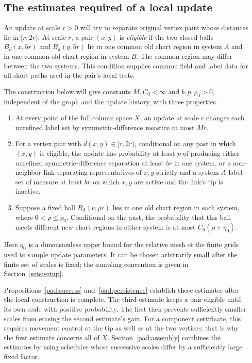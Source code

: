 \subsection{The estimates required of a local update}

An update at scale $r>0$ will try to separate original vertex pairs
whose distances lie in $[r,2r)$. At scale $r$, a pair $(x,y)$ is
\emph{eligible} if the two closed balls $B_d(x,5r)$ and $B_d(y,5r)$
lie in one common old chart region in system $A$ and in one common
old chart region in system $B$. The common region may differ between
the two systems. This condition supplies common field and label data
for all short paths used in the pair's local tests.

The construction below will give constants $M,C_0<\infty$ and
$b,p,\rho_0>0$, independent of the graph and the update history,
with three properties.
\begin{enumerate}
\item At every point of the full column space $X$, an update at scale
$r$ changes each unrefined label set by symmetric-difference measure
at most $Mr$.
\item For a vertex pair with $d(x,y)\in[r,2r)$, conditional on any past
in which $(x,y)$ is eligible, the update
has probability at least $p$ of producing either unrefined symmetric-difference separation
at least $br$ in one system, or a non-neighbor link separating
representatives of $x,y$ strictly and a system-$A$ label set of measure
at least $br$ on which $x,y$ are active and the link's tip is inactive.
\item Suppose a fixed ball $B_d(v,\rho r)$ lies in one old chart region in each
system, where $0<\rho\le\rho_0$. Conditional on the past, the probability
that this ball meets different new chart regions in either system is
at most $C_0(\rho+\eta_0)$.
\end{enumerate}
Here $\eta_0$ is a dimensionless upper bound for the relative mesh of
the finite grids used to sample update parameters. It can be chosen
arbitrarily small after the finite set of scales is fixed; the
sampling convention is given in Section~\ref{sets:setup}.

Propositions~\ref{pad:success} and~\ref{pad:persistence} establish
these estimates after the local construction is complete. The third
estimate keeps a pair eligible until its own scale with positive
probability. The first then prevents sufficiently smaller scales from
erasing the second estimate's gain. For a component certificate, this
requires movement control at the tip as well as at the two vertices;
that is why the first estimate concerns all of $X$. Section~\ref{pad:assembly}
combines the estimates by using schedules whose successive scales
differ by a sufficiently large fixed factor.
